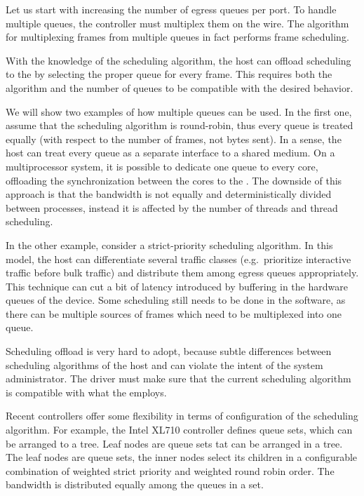 Let us start with increasing the number of egress queues per port. To handle
multiple queues, the controller must multiplex them on the wire. The algorithm for
multiplexing frames from multiple queues in fact performs frame scheduling.

With the knowledge of the scheduling algorithm, the host can offload scheduling
to the  by selecting the proper queue for every frame. This requires
both the algorithm and the number of queues to be compatible with the desired
behavior.

We will show two examples of how multiple queues can be used. In the first one, assume that
the scheduling algorithm is round-robin, thus every queue is treated equally
(with respect to the number of frames, not bytes sent). In a sense, the host can
treat every queue as a separate interface to a shared medium. On
a multiprocessor system, it is possible to dedicate one queue to every core,
offloading the synchronization between the cores to the . The downside of
this approach is that the bandwidth is not equally and deterministically divided
between processes, instead it is affected by the number of threads and thread
scheduling.

In the other example, consider a strict-priority scheduling algorithm. In this
model, the host can differentiate several traffic classes (e.g.\ prioritize
interactive traffic before bulk traffic) and distribute them among egress
queues appropriately. This technique can cut a bit of latency introduced by
buffering in the hardware queues of the device. Some scheduling still needs to
be done in the software, as there can be multiple sources of frames which
need to be multiplexed into one queue.

Scheduling offload is very hard to adopt, because subtle differences between
scheduling algorithms of the host and  can violate the intent of the
system administrator. The  driver must make sure that the current
scheduling algorithm is compatible with what the  employs.

Recent controllers offer some flexibility in terms of configuration of the
scheduling algorithm. For example, the Intel XL710 controller \cite{XL710}
defines queue sets, which can be arranged to a tree. Leaf nodes are queue sets
tat can be arranged in a tree. The leaf nodes are queue sets,
the inner nodes select its children in a configurable combination of weighted
strict priority and weighted round robin order. The bandwidth is distributed
equally among the queues in a set.

